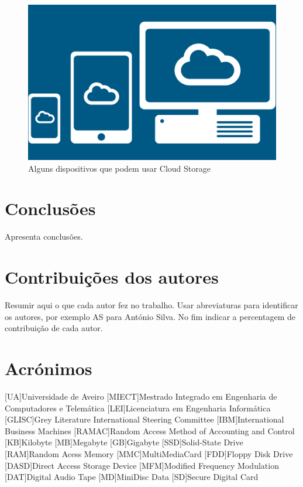 \documentclass{report}
\begin{document}
\vspace{15mm}
 
 	\begin{figure} [h]
		\centering
		\includegraphics[scale=0.5]{cloud-storage2.png}
		\caption{Alguns dispositivos que podem usar Cloud Storage}
	\end{figure}

	
		
	

\chapter{Conclusões}
\label{chap.conclusao}
Apresenta conclusões.

\chapter*{Contribuições dos autores}
Resumir aqui o que cada autor fez no trabalho.
Usar abreviaturas para identificar os autores,
por exemplo AS para António Silva.
No fim indicar a percentagem de contribuição de cada autor.

\chapter*{Acrónimos}
\begin{acronym}
[UA]{Universidade de Aveiro}
[MIECT]{Mestrado Integrado em Engenharia de Computadores e Telemática}
[LEI]{Licenciatura em Engenharia Informática}
[GLISC]{Grey Literature International Steering Committee}
[IBM]{International Business Machines}
[RAMAC]{Random Access Method of Accounting and Control}
[KB]{Kilobyte}
[MB]{Megabyte}
[GB]{Gigabyte}
[SSD]{Solid-State Drive}
[RAM]{Random Acess Memory}
[MMC]{MultiMediaCard}
[FDD]{Floppy Disk Drive}
[DASD]{Direct Access Storage Device}
[MFM]{Modified Frequency Modulation}
[DAT]{Digital Audio Tape}
[MD]{MiniDisc Data}
[SD]{Secure Digital Card}
\end{acronym}


\printbibliography
\end{document}
